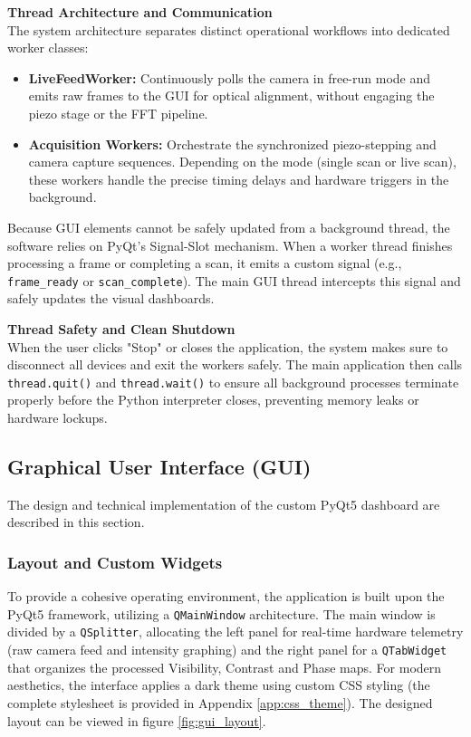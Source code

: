 \documentclass[12pt,a4paper]{article}
\begin{document}
        \textbf{Thread Architecture and Communication} \\
        The system architecture separates distinct operational workflows into dedicated worker classes:
        \begin{itemize}
            \item \textbf{\textbf{LiveFeedWorker}:} Continuously polls the camera in free-run mode and emits raw frames to the \ac{GUI} for optical alignment, without engaging the piezo stage or the \ac{FFT} pipeline.
            \item \textbf{\textbf{Acquisition Workers}:} Orchestrate the synchronized piezo-stepping and camera capture sequences. Depending on the mode (single scan or live scan), these workers handle the precise timing delays and hardware triggers in the background.
        \end{itemize}

        Because GUI elements cannot be safely updated from a background thread, the software relies on PyQt's Signal-Slot mechanism. When a worker thread finishes processing a frame or completing a scan, it emits a custom signal (e.g., \texttt{frame\_ready} or \texttt{scan\_complete}). The main GUI thread intercepts this signal and safely updates the visual dashboards.

        \textbf{Thread Safety and Clean Shutdown} \\
        When the user clicks "Stop" or closes the application, the system makes sure to disconnect all devices and exit the workers safely. The main application then calls \texttt{thread.quit()} and \texttt{thread.wait()} to ensure all background processes terminate properly before the Python interpreter closes, preventing memory leaks or hardware lockups.

    \subsection{Graphical User Interface (GUI)}
    The design and technical implementation of the custom PyQt5 dashboard are described in this section.

        \subsubsection{Layout and Custom Widgets}
        To provide a cohesive operating environment, the application is built upon the PyQt5 framework, utilizing a \texttt{QMainWindow} architecture. The main window is divided by a \texttt{QSplitter}, allocating the left panel for real-time hardware telemetry (raw camera feed and intensity graphing) and the right panel for a \texttt{QTabWidget} that organizes the processed Visibility, Contrast and Phase maps. For modern aesthetics, the interface applies a dark theme using custom CSS styling (the complete stylesheet is provided in Appendix \ref{app:css_theme}).
        The designed layout can be viewed in figure \ref{fig:gui_layout}.
\end{document}
